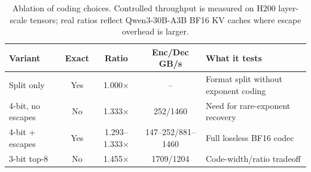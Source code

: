 \begin{table}[t]
\centering
\small
\caption{Ablation of \splitzip coding choices. Controlled throughput is measured on H200 layer-scale tensors; real ratios reflect Qwen3-30B-A3B BF16 KV caches where escape overhead is larger.}
\label{tab:codec-ablation}
\begin{tabularx}{\linewidth}{lcccX}
\toprule
Variant & Exact & Ratio & Enc/Dec GB/s & What it tests \\
\midrule
Split only & Yes & 1.000$\times$ & -- & Format split without exponent coding \\
4-bit, no escapes & No & 1.333$\times$ & 252/1460 & Need for rare-exponent recovery \\
4-bit + escapes & Yes & 1.293--1.333$\times$ & 147--252/881--1460 & Full lossless BF16 codec \\
3-bit top-8 & No & 1.455$\times$ & 1709/1204 & Code-width/ratio tradeoff \\
\bottomrule
\end{tabularx}
\end{table}
